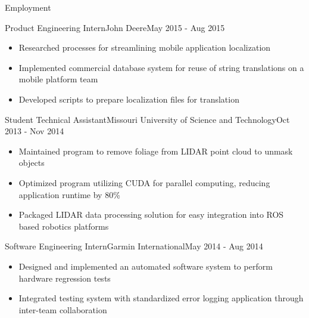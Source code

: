 \documentclass[]{mcdowellcv}
\begin{document}
\begin{cvsection}{Employment}
\begin{johndeere}
    \begin{cvsubsection}{Product Engineering Intern}{John Deere}{May 2015 - Aug 2015}
        \begin{itemize}
            \item Researched processes for streamlining mobile application localization
            \item Implemented commercial database system for reuse of string translations on a mobile platform team
            \item Developed scripts to prepare localization files for translation
        \end{itemize}
    \end{cvsubsection}
\end{johndeere}
    
\begin{rockmech}
    \begin{cvsubsection}[2]{Student Technical Assistant}{Missouri University of Science and Technology}{Oct 2013 - Nov 2014}        
        \begin{itemize}
            \item Maintained program to remove foliage from LIDAR point cloud to unmask objects
            \item Optimized program utilizing CUDA for parallel computing, reducing application runtime by 80\%
            \item Packaged LIDAR data processing solution for easy integration into ROS based robotics platforms
        \end{itemize}
    \end{cvsubsection}
\end{rockmech}
    
\begin{garmin}
    \begin{cvsubsection}{Software Engineering Intern}{Garmin International}{May 2014 - Aug 2014}   
        \begin{itemize}
            \item Designed and implemented an automated software system to perform hardware regression tests
            \item Integrated testing system with standardized error logging application through inter-team collaboration
        \end{itemize}
    \end{cvsubsection}
\end{garmin}


\end{cvsection}
\end{document}
